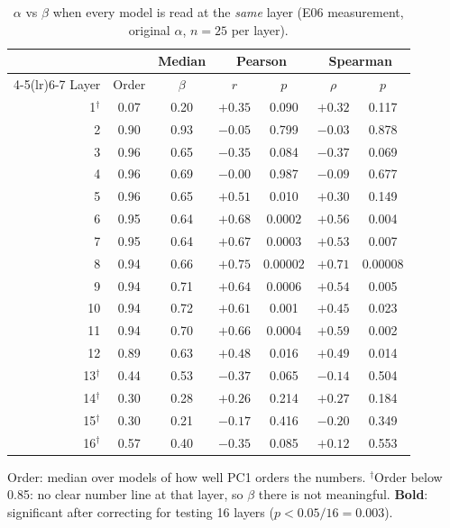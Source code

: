 \documentclass[11pt]{article}
\begin{document}
\begin{table}[h]
\centering\small
\caption{$\alpha$ vs $\beta$ when every model is read at the \emph{same} layer (E06 measurement,
original $\alpha$, $n = 25$ per layer).}
\label{tab:e06layer}
\begin{tabular}{@{}rcc cc cc@{}}
\toprule
 & & Median & \multicolumn{2}{c}{Pearson} & \multicolumn{2}{c}{Spearman} \\
\cmidrule(lr){4-5}\cmidrule(lr){6-7}
Layer & Order & $\beta$ & $r$ & $p$ & $\rho$ & $p$ \\
\midrule
1$^\dagger$ & 0.07 & 0.20 & $+0.35$ & 0.090 & $+0.32$ & 0.117 \\
2 & 0.90 & 0.93 & $-0.05$ & 0.799 & $-0.03$ & 0.878 \\
3 & 0.96 & 0.65 & $-0.35$ & 0.084 & $-0.37$ & 0.069 \\
4 & 0.96 & 0.69 & $-0.00$ & 0.987 & $-0.09$ & 0.677 \\
5 & 0.96 & 0.65 & $+0.51$ & 0.010 & $+0.30$ & 0.149 \\
6 & 0.95 & 0.64 & $\mathbf{+0.68}$ & $0.0002$ & $+0.56$ & 0.004 \\
7 & 0.95 & 0.64 & $\mathbf{+0.67}$ & $0.0003$ & $+0.53$ & 0.007 \\
8 & 0.94 & 0.66 & $\mathbf{+0.75}$ & $0.00002$ & $\mathbf{+0.71}$ & $0.00008$ \\
9 & 0.94 & 0.71 & $\mathbf{+0.64}$ & $0.0006$ & $+0.54$ & 0.005 \\
10 & 0.94 & 0.72 & $\mathbf{+0.61}$ & 0.001 & $+0.45$ & 0.023 \\
11 & 0.94 & 0.70 & $\mathbf{+0.66}$ & $0.0004$ & $\mathbf{+0.59}$ & 0.002 \\
12 & 0.89 & 0.63 & $+0.48$ & 0.016 & $+0.49$ & 0.014 \\
13$^\dagger$ & 0.44 & 0.53 & $-0.37$ & 0.065 & $-0.14$ & 0.504 \\
14$^\dagger$ & 0.30 & 0.28 & $+0.26$ & 0.214 & $+0.27$ & 0.184 \\
15$^\dagger$ & 0.30 & 0.21 & $-0.17$ & 0.416 & $-0.20$ & 0.349 \\
16$^\dagger$ & 0.57 & 0.40 & $-0.35$ & 0.085 & $+0.12$ & 0.553 \\
\bottomrule
\end{tabular}

\smallskip
\parbox{0.9\textwidth}{\footnotesize Order: median over models of how well PC1 orders the numbers.
$^\dagger$Order below 0.85: no clear number line at that layer, so $\beta$ there is not meaningful.
\textbf{Bold}: significant after correcting for testing 16 layers ($p<0.05/16=0.003$).}
\end{table}
\end{document}
